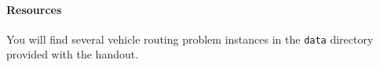 \documentclass[11pt]{article}
\begin{document}
\paragraph{Resources}
You will find several vehicle routing problem instances in the \texttt{data} directory provided with the handout.












 

\end{document}
